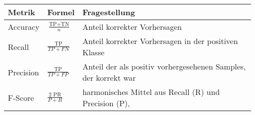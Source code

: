 {
\renewcommand*{\arraystretch}{1.6}
\begin{tabular}{@{}llp{8cm}@{}}
    \toprule
    \textbf{Metrik} & \textbf{Formel} & \textbf{Fragestellung} \\
    \midrule
    Accuracy
        & $\frac{\text{TP} + \text{TN}}{n}$
        & Anteil korrekter Vorhersagen \\
    Recall
        & $\frac{\text{TP}}{TP + FN}$
        & Anteil korrekter Vorhersagen in der positiven Klasse \\
    Precision
        & $\frac{\text{TP}}{TP + FP}$
        & Anteil der als positiv vorhergesehenen Samples, der korrekt war \\
    F-Score
        & $\frac{2 \text{ PR}}{P + R}$
        & harmonisches Mittel aus Recall (R) und Precision (P), \citet{f-measure} \\
    \bottomrule
\end{tabular}
}
